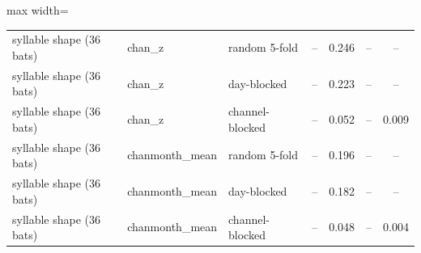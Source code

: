 \begin{table}[htbp]
\begin{adjustbox}{max width=\linewidth}
\begin{tabular}{lllcccc}
syllable shape (36 bats) & chan\_z & random 5-fold & -- & 0.246 & -- & -- \\
syllable shape (36 bats) & chan\_z & day-blocked & -- & 0.223 & -- & -- \\
syllable shape (36 bats) & chan\_z & channel-blocked & -- & 0.052 & -- & 0.009 \\
syllable shape (36 bats) & chanmonth\_mean & random 5-fold & -- & 0.196 & -- & -- \\
syllable shape (36 bats) & chanmonth\_mean & day-blocked & -- & 0.182 & -- & -- \\
syllable shape (36 bats) & chanmonth\_mean & channel-blocked & -- & 0.048 & -- & 0.004 \\
\bottomrule
\end{tabular}
\end{adjustbox}
\end{table}
